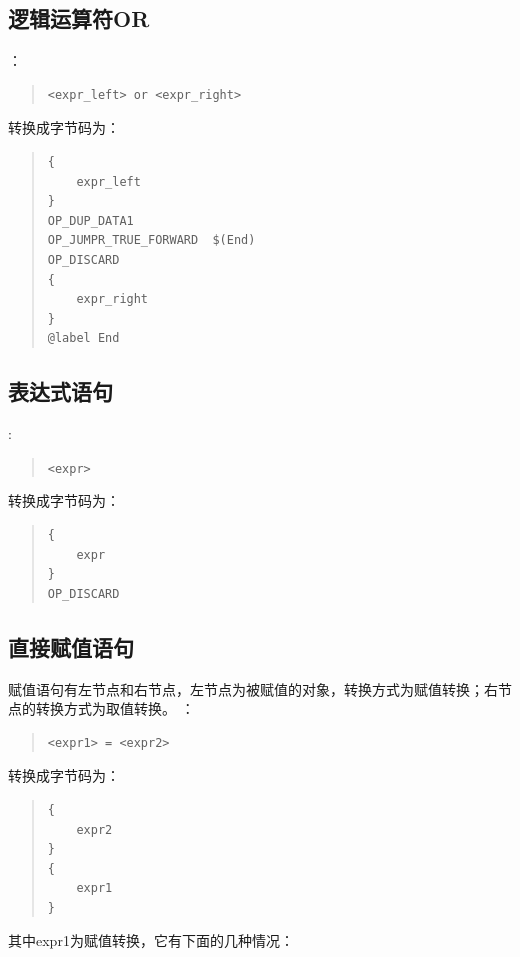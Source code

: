 \subsection{逻辑运算符OR}
：
\begin{quote}
\begin{verbatim}
<expr_left> or <expr_right>
\end{verbatim}
\end{quote}
转换成字节码为：
\begin{quote}
\begin{verbatim}
{
    expr_left
}
OP_DUP_DATA1
OP_JUMPR_TRUE_FORWARD  $(End)
OP_DISCARD
{
    expr_right
}
@label End
\end{verbatim}
\end{quote}

\subsection{表达式语句}
:
\begin{quote}
\verb|<expr>|
\end{quote}
转换成字节码为：
\begin{quote}
\begin{verbatim}
{
    expr
}
OP_DISCARD
\end{verbatim}
\end{quote}

\subsection{直接赋值语句}
赋值语句有左节点和右节点，左节点为被赋值的对象，转换方式为赋值转换；右节点的转换方式为取值转换。
：
\begin{quote}
\begin{verbatim}
<expr1> = <expr2>
\end{verbatim}
\end{quote}
转换成字节码为：
\begin{quote}
\begin{verbatim}
{
    expr2
}
{
    expr1
}
\end{verbatim}
\end{quote}
其中expr1为赋值转换，它有下面的几种情况：

